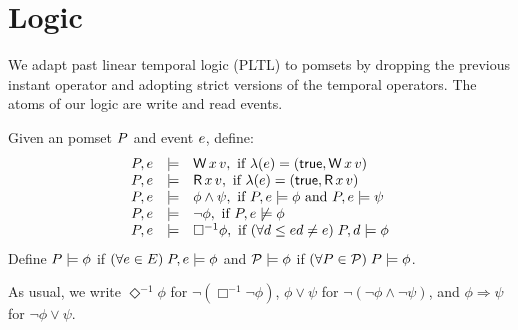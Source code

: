 \section{Logic}
\label{sec:logic}

\newcommand{\pLTL}{\textsf{PLTL}}
\newcommand{\once}{\Diamond^{-1}}
\newcommand{\always}{\Box^{-1}}
\newcommand{\afo}{\phi}
\newcommand{\bfo}{\psi}
\newcommand{\mods}{\texsf{Models}}

We adapt past linear temporal logic (\pLTL)
\cite{Lichtenstein:1985:GP:648065.747612} to pomsets by dropping the previous
instant operator and adopting strict versions of the temporal operators.
The atoms of our logic are write and read events.
\begin{definition} %
  Given an pomset $P$ and event $e$, define:
  \begin{displaymath}
    \begin{array}{lrl}
      \aPS,\aEv &\models& \DW{\aLoc}{\aVal}, \text{ if } \labelling(\aEv) =  (\TRUE, \DW{\aLoc}{\aVal}) \\
      \aPS,\aEv &\models& \DR{\aLoc}{\aVal}, \text{ if } \labelling(\aEv) =  (\TRUE, \DR{\aLoc}{\aVal}) \\
      \aPS,\aEv &\models& \afo\land\bfo, \text{ if } \aPS,\aEv \models  \afo \text{ and } \aPS,\aEv \models  \bfo \\
      \aPS,\aEv &\models& \neg\afo, \text{ if } \aPS,\aEv \not\models \afo \\
      \aPS,\aEv &\models& \always\afo, \text{ if } (\forall \bEv \le \aEv  \bEv\not=\aEv)\; \aPS,\bEv \models \afo
    \end{array} 
  \end{displaymath}
  Define $\aPS \models \afo$ if
  $(\forall \aEv \in \Event) \;\aPS,\aEv \models\afo$ and $\aPSS\models \afo$
  if $(\forall \aPS \in \aPSS)\; \aPS \models\afo$.
\end{definition}
As usual, we write
$\once\afo$ for $\neg(\always\neg\afo)$,
$\afo\lor\bfo$ for $\neg(\neg \afo \land \neg \bfo)$,
and $\afo \Rightarrow \bfo$ for $\neg \afo \lor \bfo$.


